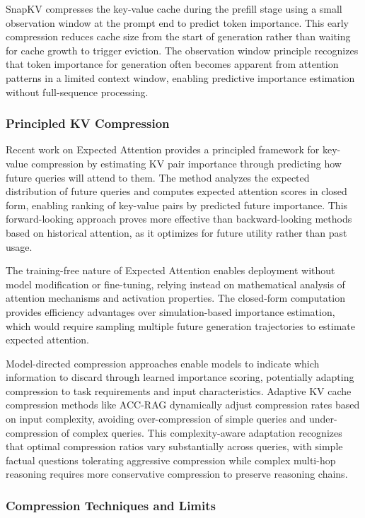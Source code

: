 \documentclass[11pt,letterpaper]{article}
\begin{document}
SnapKV compresses the key-value cache during the prefill stage using a small observation window at the prompt end to predict token importance. This early compression reduces cache size from the start of generation rather than waiting for cache growth to trigger eviction. The observation window principle recognizes that token importance for generation often becomes apparent from attention patterns in a limited context window, enabling predictive importance estimation without full-sequence processing.

\subsubsection{Principled KV Compression}

Recent work on Expected Attention \cite{zhang2025expected} provides a principled framework for key-value compression by estimating KV pair importance through predicting how future queries will attend to them. The method analyzes the expected distribution of future queries and computes expected attention scores in closed form, enabling ranking of key-value pairs by predicted future importance. This forward-looking approach proves more effective than backward-looking methods based on historical attention, as it optimizes for future utility rather than past usage.

The training-free nature of Expected Attention enables deployment without model modification or fine-tuning, relying instead on mathematical analysis of attention mechanisms and activation properties. The closed-form computation provides efficiency advantages over simulation-based importance estimation, which would require sampling multiple future generation trajectories to estimate expected attention.

Model-directed compression approaches enable models to indicate which information to discard through learned importance scoring, potentially adapting compression to task requirements and input characteristics. Adaptive KV cache compression methods like ACC-RAG dynamically adjust compression rates based on input complexity, avoiding over-compression of simple queries and under-compression of complex queries. This complexity-aware adaptation recognizes that optimal compression ratios vary substantially across queries, with simple factual questions tolerating aggressive compression while complex multi-hop reasoning requires more conservative compression to preserve reasoning chains.

\subsubsection{Compression Techniques and Limits}
\end{document}
